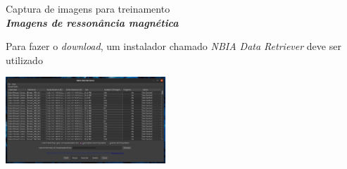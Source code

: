 \documentclass{beamer}
\begin{document}
    \begin{frame}{Captura de imagens para treinamento}{\thesection \, \secname \\ \textbf{\textit{Imagens de ressonância magnética}}}

        Para fazer o \textit{download}, um instalador chamado \textit{NBIA Data Retriever} \cite{cancer_imaging_archive_cancer_2022} deve ser utilizado

        \vspace{0.2cm}

        \centering
        \includegraphics[width=6cm]{img/nbia_data_retriever.png} \\

    \end{frame}
    
\end{document}
